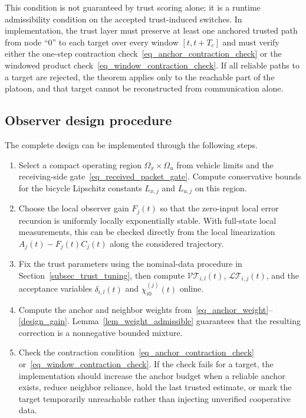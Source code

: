 \documentclass[journal,twoside]{IEEEtran}
\def\LT{\mathcal{LT}} %
\def\VT{\mathcal{VT}} %
\begin{document}
This condition is not guaranteed by trust scoring alone; it is a runtime admissibility condition on the accepted trust-induced switches. In implementation, the trust layer must preserve at least one anchored trusted path from node ``0'' to each target over every window $[t,t+T_c]$ and must verify either the one-step contraction check~\eqref{eq_anchor_contraction_check} or the windowed product check~\eqref{eq_window_contraction_check}. If all reliable paths to a target are rejected, the theorem applies only to the reachable part of the platoon, and that target cannot be reconstructed from communication alone.

\subsection{Observer design procedure}
The complete design can be implemented through the following steps.
\begin{enumerate}
    \item Select a compact operating region $\Omega_x\times\Omega_u$ from vehicle limits and the receiving-side gate~\eqref{eq_received_packet_gate}. Compute conservative bounds for the bicycle Lipschitz constants $L_{x,j}$ and $L_{u,j}$ on this region.
    \item Choose the local observer gain $F_j(t)$ so that the zero-input local error recursion is uniformly locally exponentially stable. With full-state local measurements, this can be checked directly from the local linearization $A_j(t)-F_j(t)C_j(t)$ along the considered trajectory.
    \item Fix the trust parameters using the nominal-data procedure in Section~\ref{subsec_trust_tuning}, then compute $\VT_{i,l}(t)$, $\LT_{i,j}(t)$, and the acceptance variables $\delta_{i,l}(t)$ and $\chi_{i0}^{(j)}(t)$ online.
    \item Compute the anchor and neighbor weights from~\eqref{eq_anchor_weight}--\eqref{design_gain}. Lemma~\ref{lem_weight_admissible} guarantees that the resulting correction is a nonnegative bounded mixture.
    \item Check the contraction condition~\eqref{eq_anchor_contraction_check} or~\eqref{eq_window_contraction_check}. If the check fails for a target, the implementation should increase the anchor budget when a reliable anchor exists, reduce neighbor reliance, hold the last trusted estimate, or mark the target temporarily unreachable rather than injecting unverified cooperative data.
\end{enumerate}
\end{document}
